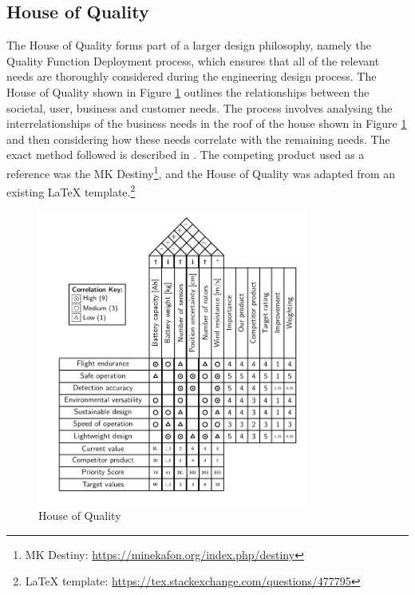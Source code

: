 \subsection{House of Quality}
\label{hoq}

The House of Quality forms part of a larger design philosophy, namely the Quality Function Deployment process, which ensures that all of the relevant needs are thoroughly considered during the engineering design process. The House of Quality shown in Figure \ref{fig:hoq} outlines the relationships between the societal, user, business and customer needs. The process involves analysing the interrelationships of the business needs in the roof of the house shown in Figure \ref{fig:hoq} and then considering how these needs correlate with the remaining needs. The exact method followed is described in \cite{chanqfd}. The competing product used as a reference was the MK Destiny\footnote{MK Destiny: \url{https://minekafon.org/index.php/destiny}}, and the House of Quality was adapted from an existing {\LaTeX} template.\footnote{{\LaTeX} template: \url{https://tex.stackexchange.com/questions/477795}}




\begin{figure}[H]
\centering
\includegraphics[width=0.79\textwidth]{figs/Samuel/Figures/test (2).pdf}
\caption{House of Quality}
\label{fig:hoq}
\end{figure}


